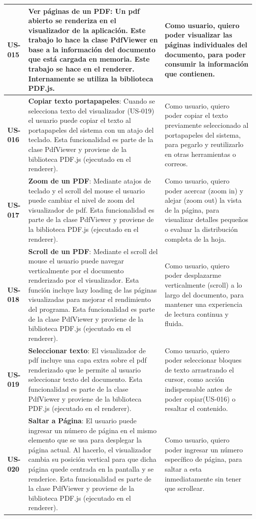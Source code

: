 \begin{longtable}{|l||p{7cm}|p{4.5cm}|}
\hline
\hline
\textbf{US-015} & \textbf{Ver páginas de un PDF}:  Un pdf abierto se renderiza en el visualizador de la aplicación. Este trabajo lo hace la clase PdfViewer en base a la información del documento que está cargada en memoria. Este trabajo se hace en el renderer. Internamente se utiliza la biblioteca PDF.js. & Como usuario, quiero poder visualizar las páginas individuales del documento, para poder consumir la información que contienen.\\
\hline
\textbf{US-016} & \textbf{Copiar texto portapapeles}: Cuando se selecciona texto del visualizador (US-019) el usuario puede copiar el texto al portapapeles del sistema con un atajo del teclado. Esta funcionalidad es parte de la clase PdfViewer y proviene de la biblioteca PDF.js (ejecutado en el renderer).& Como usuario, quiero poder copiar el texto previamente seleccionado al portapapeles del sistema, para pegarlo y reutilizarlo en otras herramientas o correos.\\
\hline
\textbf{US-017} & \textbf{Zoom de un PDF}: Mediante atajos de teclado y el scroll del mouse el usuario puede cambiar el nivel de zoom del visualizador de pdf.  Esta funcionalidad es parte de la clase PdfViewer y proviene de la biblioteca PDF.js (ejecutado en el renderer). & Como usuario, quiero poder acercar (zoom in) y alejar (zoom out) la vista de la página, para visualizar detalles pequeños o evaluar la distribución completa de la hoja.\\
\hline
\textbf{US-018} & \textbf{Scroll de un PDF}: Mediante el scroll del mouse el usuario puede navegar verticalmente por el documento renderizado por el visualizador. Esta función incluye lazy loading de las páginas visualizadas para mejorar el rendimiento del programa.  Esta funcionalidad es parte de la clase PdfViewer y proviene de la biblioteca PDF.js (ejecutado en el renderer). & Como usuario, quiero poder desplazarme verticalmente (scroll) a lo largo del documento, para mantener una experiencia de lectura continua y fluida.\\
\hline
\textbf{US-019} & \textbf{Seleccionar texto}: El visualizador de pdf incluye una capa extra sobre el pdf renderizado que le permite al usuario seleccionar texto del documento. Esta funcionalidad es parte de la clase PdfViewer y proviene de la biblioteca PDF.js (ejecutado en el renderer). & Como usuario, quiero poder seleccionar bloques de texto arrastrando el cursor, como acción indispensable antes de poder copiar(US-016) o resaltar el contenido.\\
\hline
\textbf{US-020} & \textbf{Saltar a Página}: El usuario puede ingresar un número de página en el mismo elemento que se usa para desplegar la página actual. Al hacerlo, el visualizador cambia su posición vertical para que dicha página quede centrada en la pantalla y se renderice. Esta funcionalidad es parte de la clase PdfViewer y proviene de la biblioteca PDF.js (ejecutado en el renderer). & Como usuario, quiero poder ingresar un número específico de página, para saltar a esta inmediatamente sin tener que scrollear.\\

\end{longtable}
